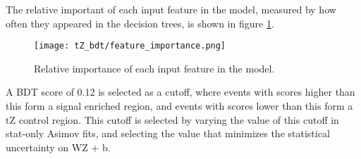 The relative important of each input feature in the model, measured by how often they appeared in the decision trees, is shown in figure \ref{fig:tZ_fImp}.

\begin{figure}[H] 
\center
        \texttt{[image: tZ\_bdt/feature\_importance.png]}
        \caption{Relative importance of each input feature in the model.}
        \label{fig:tZ_fImp}
\end{figure}

A BDT score of 0.12 is selected as a cutoff, where events with scores higher than this form a signal enriched region, and events with scores lower than this form a tZ control region. This cutoff is selected by varying the value of this cutoff in stat-only Asimov fits, and selecting the value that minimizes the statistical uncertainty on WZ + b.


